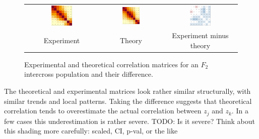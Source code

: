 \documentclass{article}
\newcommand{\TODO}[1]{{\color{brickred} TODO:  {#1}}}
\begin{document}
\begin{figure}[htp]
  \begin{center}
    \begin{tabular}{ccc}
      \includegraphics[width = 0.300\textwidth]{./img/chevCorr.png} &
      \includegraphics[width = 0.300\textwidth]{./img/chevCorrTheory.png} &
      \includegraphics[width = 0.300\textwidth]{./img/chevCorrDiff.png} \\
      {\footnotesize Experiment} &
      {\footnotesize Theory} &
      {\footnotesize Experiment minus theory} \\
    \end{tabular}
  \end{center}
  \caption{Experimental and theoretical correlation matrices for an $F_2$ intercross population and their difference.}
  \label{fig:corr2real}
\end{figure}

The theoretical and experimental matrices look rather similar structurally, with similar trends and local patterns. Taking the difference suggests that theoretical correlation tends to overestimate the actual correlation between $z_j$ and $z_k$. In a few cases this underestimation is rather severe. \TODO{Is it severe? Think about this shading more carefully: scaled, CI, p-val, or the like}
\end{document}
